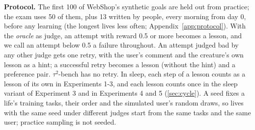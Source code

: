 \textbf{Protocol.} The first 100 of WebShop's synthetic goals are held out from practice; the exam uses 50 of them, plus 13 written by people, every morning from day 0, before any learning (the longest lives less often; Appendix~\ref{app:protocol}). With the \emph{oracle} as judge, an attempt with reward 0.5 or more becomes a lesson, and we call an attempt below 0.5 a failure throughout. An attempt judged bad by any other judge gets one retry, with the user's comment and the creature's own lesson as a hint; a successful retry becomes a lesson (without the hint) and a preference pair. $\tau^2$-bench has no retry. In sleep, each step of a lesson counts as a lesson of its own in Experiments 1-3, and each lesson counts once in the sleep variant of Experiment 3 and in Experiments 4 and 5 (\ref{sec:cycle}). A seed fixes a life's training tasks, their order and the simulated user's random draws, so lives with the same seed under different judges start from the same tasks and the same user; practice sampling is not seeded.

